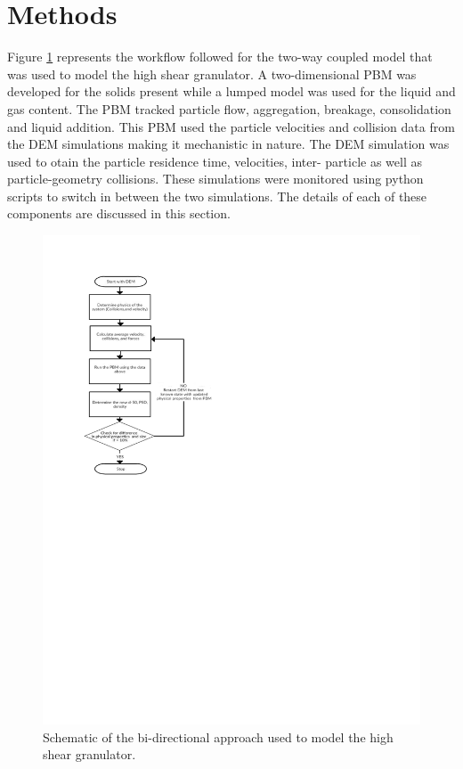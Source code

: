 \documentclass[fleqn,twoside,10pt]{article}
\begin{document}
\section{Methods}
\label{methods}
Figure \ref{fig:mthds_flow_dia} represents the workflow followed for the two-way coupled model that was used to model 
the high shear granulator. A two-dimensional PBM was developed for the solids present while a lumped model was 
used for the liquid and gas content. The PBM tracked particle flow, aggregation, breakage, 
consolidation and liquid addition. This PBM used the particle velocities and collision data from the DEM simulations 
making it mechanistic in nature. The DEM simulation was used to otain the particle residence time, velocities, inter-
particle as well as particle-geometry collisions. These simulations were monitored using python scripts to switch 
in between the two simulations. The details of each of these components are discussed in this section. 

\begin{figure}
\centering
\includegraphics[scale=1]{flo_dia.pdf}
\caption{Schematic of the bi-directional approach used to model the high shear granulator.}
\label{fig:mthds_flow_dia}
\end{figure}
\lipsum[0]
\end{document}
